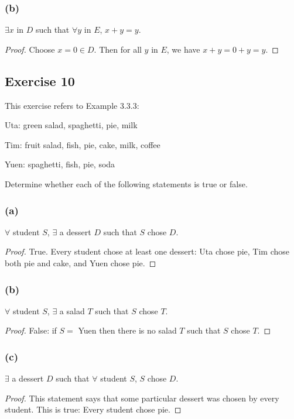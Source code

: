 \documentclass[14pt]{extarticle}
\newcommand{\fa}{\forall}
\newcommand{\te}{\exists}
\begin{document}
\subsubsection{(b)}
$\te x$ in $D$ such that $\fa y$ in $E$, $x + y = y$.

\begin{proof}
Choose $x = 0 \in D$. Then for all $y$ in $E$, we have $x + y = 0 + y = y$.
\end{proof}

\subsection{Exercise 10}
This exercise refers to Example 3.3.3:

Uta: green salad, spaghetti, pie, milk

Tim: fruit salad, fish, pie, cake, milk, coffee

Yuen: spaghetti, fish, pie, soda

Determine whether each of the following statements is true or false.

\subsubsection{(a)}
$\fa$ student $S$, $\te$ a dessert $D$ such that $S$ chose $D$.

\begin{proof}
True. Every student chose at least one dessert: Uta chose pie, Tim chose both pie and cake, and Yuen chose pie.
\end{proof}

\subsubsection{(b)}
$\fa$ student $S$, $\te$ a salad $T$ such that $S$ chose $T$.

\begin{proof}
False: if $S = $ Yuen then there is no salad $T$ such that $S$ chose $T$.
\end{proof}

\subsubsection{(c)}
$\te$ a dessert $D$ such that $\fa$ student $S$, $S$ chose $D$.

\begin{proof}
This statement says that some particular dessert was chosen by every student. This is true: Every student chose pie.
\end{proof}
\end{document}
